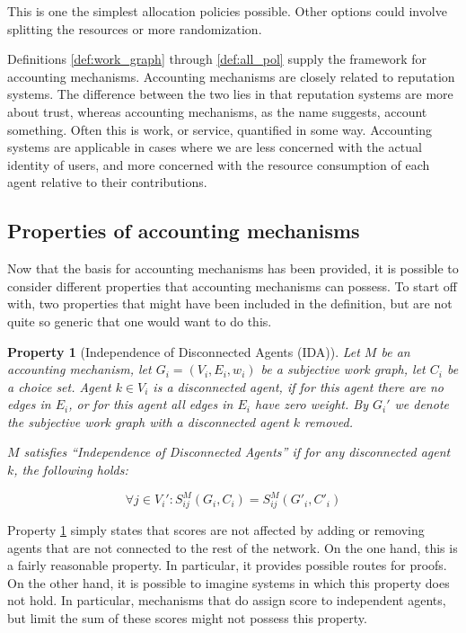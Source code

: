 \documentclass[a4paper,11pt]{book}
\newtheorem{property}{Property}
\theoremstyle{definition}
\begin{document}
This is one the simplest allocation policies possible. Other options could involve  
splitting the resources or more randomization.

Definitions \ref{def:work_graph} through \ref{def:all_pol} supply the framework for accounting
mechanisms. Accounting mechanisms are closely related to reputation systems. The difference
between the two lies in that reputation systems are more about trust, whereas accounting mechanisms,
as the name suggests, account something. Often this is work, or service, quantified in some way.
Accounting systems are applicable in cases where we are less concerned with the actual identity
of users, and more concerned with the resource consumption of each agent relative to their contributions.

\subsection{Properties of accounting mechanisms}

Now that the basis for accounting mechanisms has been provided, it is possible to consider different
properties that accounting mechanisms can possess. To start off with, two properties that might have
been included in the definition, but are not quite so generic that one would want to do this.

\begin{property}[Independence of Disconnected Agents (IDA)]
    Let $M$ be an accounting mechanism, let $G_i = (V_i, E_i, w_i)$ be a subjective work graph, let 
    $C_i$ be a choice set. Agent $k \in V_i$ is a disconnected agent, if for this agent there are no edges
    in $E_i$, or for this agent all edges in $E_i$ have zero weight. By $G_i'$ we denote the subjective
    work graph with a disconnected agent $k$ removed.

    $M$ satisfies ``Independence of Disconnected Agents'' if for any disconnected agent $k$, the following
    holds:

    \begin{equation*}
        \forall j \in V_i' : S_{ij}^M(G_i, C_i) = S_{ij}^M(G'_i, C'_i)
    \end{equation*}
    \label{prop:ida}
\end{property}

Property \ref{prop:ida} simply states that scores are not affected by adding or removing agents
that are not connected to the rest of the network. On the one hand, this is a fairly reasonable property.
In particular, it provides possible routes for proofs. On the other hand, it is possible to imagine systems
in which this property does not hold. In particular, mechanisms that do assign score to independent agents,
but limit the sum of these scores might not possess this property.
\end{document}
